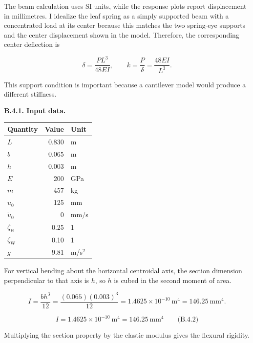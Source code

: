 \begingroup
\setlength{\abovedisplayskip}{6pt}
\setlength{\belowdisplayskip}{6pt}
\setlength{\abovedisplayshortskip}{4pt}
\setlength{\belowdisplayshortskip}{4pt}
\setlength{\intextsep}{6pt}

The beam calculation uses SI units, while the response plots report displacement in millimetres. I idealize the leaf spring as a simply supported beam with a concentrated load at its center because this matches the two spring-eye supports and the center displacement shown in the model. Therefore, the corresponding center deflection is

\[
\delta=\frac{PL^3}{48EI},
\qquad
k=\frac{P}{\delta}=\frac{48EI}{L^3}.
\]

This support condition is important because a cantilever model would produce a different stiffness.

\textbf{B.4.1. Input data.}

{ %
\begin{center}\small\begin{tabular}{@{}lrl@{}}
\toprule\noalign{}
Quantity & Value & Unit \\
\midrule\noalign{}
$L$ & 0.830 & m \\
$b$ & 0.065 & m \\
$h$ & 0.003 & m \\
$E$ & 200 & GPa \\
$m$ & 457 & kg \\
$u_0$ & 125 & mm \\
$\dot{u}_0$ & 0 & mm/s \\
$\zeta_{\mathrm{H}}$ & 0.25 & 1 \\
$\zeta_{\mathrm{W}}$ & 0.10 & 1 \\
$g$ & 9.81 & m/s$^2$ \\
\bottomrule\end{tabular}\end{center}
}

For vertical bending about the horizontal centroidal axis, the section dimension perpendicular to that axis is $h$, so $h$ is cubed in the second moment of area.

\[
I=\frac{bh^3}{12}
 =\frac{(0.065)(0.003)^3}{12}
 =1.4625\times10^{-10}\ \mathrm{m^4}
 =146.25\ \mathrm{mm^4}.
\]

\[
\boxed{I=1.4625\times10^{-10}\ \mathrm{m^4}=146.25\ \mathrm{mm^4}}
\qquad\text{(B.4.2)}
\]

Multiplying the section property by the elastic modulus gives the flexural rigidity.

